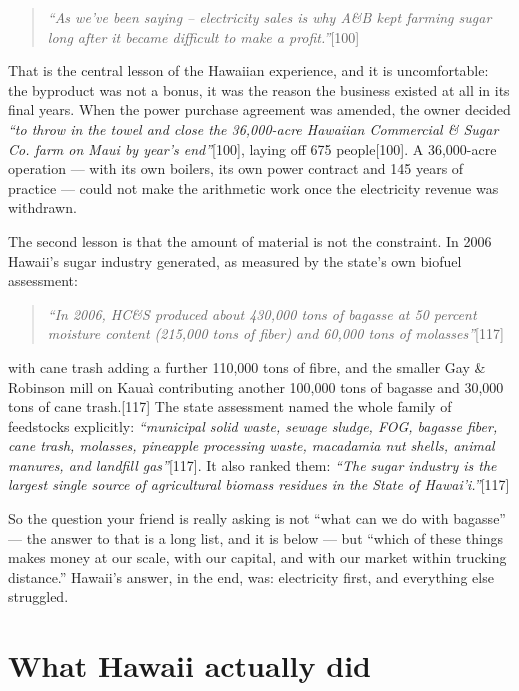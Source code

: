 \documentclass[11pt]{article}
\newcommand{\src}[1]{[#1]}
\begin{document}
\begin{quote}
\emph{``As we've been saying -- electricity sales is why A\&B kept farming sugar
long after it became difficult to make a profit.''}\src{100}
\end{quote}

That is the central lesson of the Hawaiian experience, and it is uncomfortable:
the byproduct was not a bonus, it was the reason the business existed at all in
its final years. When the power purchase agreement was amended, the owner
decided \emph{``to throw in the towel and close the 36,000-acre Hawaiian
Commercial \& Sugar Co. farm on Maui by year's end''}\src{100}, laying off 675
people\src{100}. A 36,000-acre operation --- with its own boilers, its own
power contract and 145 years of practice --- could not make the arithmetic work
once the electricity revenue was withdrawn.

The second lesson is that the amount of material is not the constraint. In 2006
Hawaii's sugar industry generated, as measured by the state's own biofuel
assessment:

\begin{quote}
\emph{``In 2006, HC\&S produced about 430,000 tons of bagasse at 50 percent
moisture content (215,000 tons of fiber) and 60,000 tons of molasses''}\src{117}
\end{quote}

\noindent
with cane trash adding a further 110{,}000 tons of fibre, and the smaller
Gay \& Robinson mill on Kaua\`i contributing another 100{,}000 tons of bagasse
and 30{,}000 tons of cane trash.\src{117} The state assessment named the whole
family of feedstocks explicitly: \emph{``municipal solid waste, sewage sludge,
FOG, bagasse fiber, cane trash, molasses, pineapple processing waste, macadamia
nut shells, animal manures, and landfill gas''}\src{117}. It also ranked them:
\emph{``The sugar industry is the largest single source of agricultural biomass
residues in the State of Hawai'i.''}\src{117}

So the question your friend is really asking is not ``what can we do with
bagasse'' --- the answer to that is a long list, and it is below --- but
``which of these things makes money at our scale, with our capital, and with
our market within trucking distance.'' Hawaii's answer, in the end, was:
electricity first, and everything else struggled.

\section{What Hawaii actually did}
\end{document}
